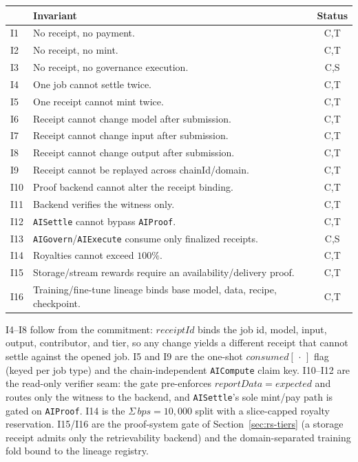 \begin{center}\small
\begin{tabular}{@{}llc@{}}
\toprule
& \textbf{Invariant} & \textbf{Status} \\
\midrule
I1  & No receipt, no payment.                                   & C,T \\
I2  & No receipt, no mint.                                       & C,T \\
I3  & No receipt, no governance execution.                      & C,S \\
I4  & One job cannot settle twice.                              & C,T \\
I5  & One receipt cannot mint twice.                            & C,T \\
I6  & Receipt cannot change model after submission.            & C,T \\
I7  & Receipt cannot change input after submission.            & C,T \\
I8  & Receipt cannot change output after submission.           & C,T \\
I9  & Receipt cannot be replayed across chainId/domain.        & C,T \\
I10 & Proof backend cannot alter the receipt binding.          & C,T \\
I11 & Backend verifies the witness only.                       & C,T \\
I12 & \texttt{AISettle} cannot bypass \texttt{AIProof}.        & C,T \\
I13 & \texttt{AIGovern}/\texttt{AIExecute} consume only finalized receipts. & C,S \\
I14 & Royalties cannot exceed $100\%$.                          & C,T \\
I15 & Storage/stream rewards require an availability/delivery proof. & C,T \\
I16 & Training/fine-tune lineage binds base model, data, recipe, checkpoint. & C,T \\
\bottomrule
\end{tabular}
\end{center}

\noindent
I4--I8 follow from the commitment: $\mathit{receiptId}$ binds the job id, model,
input, output, contributor, and tier, so any change yields a different receipt that
cannot settle against the opened job. I5 and I9 are the one-shot
$\mathit{consumed}[\,\cdot\,]$ flag (keyed per job type) and the chain-independent
\texttt{AICompute} claim key. I10--I12 are the read-only verifier seam: the gate
pre-enforces $\mathit{reportData}\!=\!\mathit{expected}$ and routes only the witness
to the backend, and \texttt{AISettle}'s sole mint/pay path is gated on
\texttt{AIProof}. I14 is the $\Sigma\,\mathit{bps}\!=\!10{,}000$ split with a
slice-capped royalty reservation. I15/I16 are the proof-system gate of
Section~\ref{sec:rs-tiers} (a storage receipt admits only the retrievability
backend) and the domain-separated training fold bound to the lineage registry.


